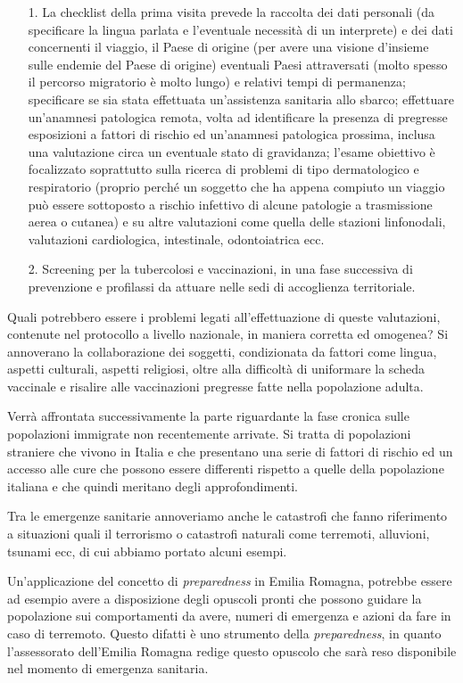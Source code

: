 \begin{itemize}
\item[1.]  
  La checklist della prima visita prevede la raccolta dei dati personali
  (da specificare la lingua parlata e l'eventuale necessità di un
  interprete) e dei dati concernenti il viaggio, il Paese di origine
  (per avere una visione d'insieme sulle endemie del Paese di origine)
  eventuali Paesi attraversati (molto spesso il percorso migratorio è
  molto lungo) e relativi tempi di permanenza; specificare se sia stata
  effettuata un'assistenza sanitaria allo sbarco; effettuare un'anamnesi
  patologica remota, volta ad identificare la presenza di pregresse
  esposizioni a fattori di rischio ed un'anamnesi patologica prossima,
  inclusa una valutazione circa un eventuale stato di gravidanza;
  l'esame obiettivo è focalizzato soprattutto sulla ricerca di problemi
  di tipo dermatologico e respiratorio (proprio perché un soggetto che
  ha appena compiuto un viaggio può essere sottoposto a rischio
  infettivo di alcune patologie a trasmissione aerea o cutanea) e su
  altre valutazioni come quella delle stazioni linfonodali, valutazioni
  cardiologica, intestinale, odontoiatrica ecc.
\item[2.]
  Screening per la tubercolosi e vaccinazioni, in una fase successiva di
  prevenzione e profilassi da attuare nelle sedi di accoglienza
  territoriale.
\end{itemize}

Quali potrebbero essere i problemi legati all'effettuazione di queste
valutazioni, contenute nel protocollo a livello nazionale, in maniera
corretta ed omogenea? Si annoverano la collaborazione dei soggetti,
condizionata da fattori come lingua, aspetti culturali, aspetti
religiosi, oltre alla difficoltà di uniformare la scheda vaccinale e
risalire alle vaccinazioni pregresse fatte nella popolazione adulta.

Verrà affrontata successivamente la parte riguardante la fase cronica
sulle popolazioni immigrate non recentemente arrivate. Si tratta di
popolazioni straniere che vivono in Italia e che presentano una serie di
fattori di rischio ed un accesso alle cure che possono essere differenti
rispetto a quelle della popolazione italiana e che quindi meritano degli
approfondimenti.

Tra le emergenze sanitarie annoveriamo anche le catastrofi che fanno
riferimento a situazioni quali il terrorismo o catastrofi naturali come
terremoti, alluvioni, tsunami ecc, di cui abbiamo portato alcuni esempi.

Un'applicazione del concetto di \emph{preparedness} in Emilia Romagna,
potrebbe essere ad esempio avere a disposizione degli opuscoli pronti
che possono guidare la popolazione sui comportamenti da avere, numeri di
emergenza e azioni da fare in caso di terremoto. Questo difatti è uno
strumento della \emph{preparedness}, in quanto l'assessorato dell'Emilia
Romagna redige questo opuscolo che sarà reso disponibile nel momento di
emergenza sanitaria.